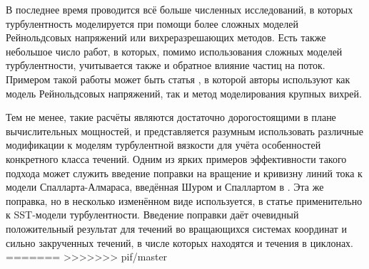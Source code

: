 	В последнее время проводится всё больше численных исследований, в которых турбулентность моделируется при помощи более сложных моделей Рейнольдсовых напряжений или вихреразрешающих методов. Есть также небольшое число работ, в которых, помимо использования сложных моделей турбулентности, учитывается также и обратное влияние частиц на поток. Примером такой работы может быть статья \cite{Lacor}, в которой авторы используют как модель Рейнольдсовых напряжений, так и метод моделирования крупных вихрей.
	
	Тем не менее, такие расчёты являются достаточно дорогостоящими в плане вычислительных мощностей, и представляется разумным использовать различные модификации к моделям турбулентной вязкости для учёта особенностей конкретного класса течений. Одним из ярких примеров эффективности такого подхода может служить введение поправки на вращение и кривизну линий тока к модели Спалларта-Алмараса, введённая Шуром и Спаллартом в \cite{ShurSpallart}. Эта же поправка, но в несколько изменённом виде используется, в статье \cite{Smirnov} применительно к SST-модели турбулентности. Введение поправки даёт очевидный положительный результат для течений во вращающихся системах координат и сильно закрученных течений, в числе которых находятся и течения в циклонах.
\newpage
=======
>>>>>>> pif/master
